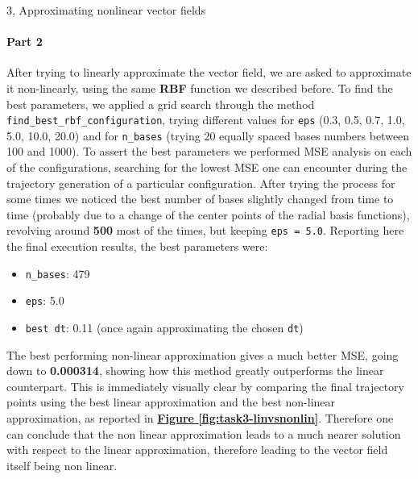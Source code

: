 \documentclass[10pt,a4paper]{article}
\begin{document}
\begin{task}{3, Approximating nonlinear vector fields}
\paragraph{Part 2}
After trying to linearly approximate the vector field, we are asked to approximate it non-linearly, using the same \textbf{RBF} function we described before. To find the best parameters, we applied a grid search through the method \texttt{find\_best\_rbf\_configuration}, trying different values for \texttt{eps} (0.3, 0.5, 0.7, 1.0, 5.0, 10.0, 20.0) and for \texttt{n\_bases} (trying 20 equally spaced bases numbers between 100 and 1000). To assert the best parameters we performed MSE analysis on each of the configurations, searching for the lowest MSE one can encounter during the trajectory generation of a particular configuration. After trying the process for some times we noticed the best number of bases slightly changed from time to time (probably due to a change of the center points of the radial basis functions), revolving around \textbf{500} most of the times, but keeping \texttt{eps = 5.0}. Reporting here the final execution results, the best parameters were:
\begin{itemize}
    \item \texttt{n\_bases}: 479 
    \item \texttt{eps}: 5.0
    \item \texttt{best dt}: 0.11 (once again approximating the chosen \texttt{dt})
\end{itemize}
The best performing non-linear approximation gives a much better MSE, going down to \textbf{0.000314}, showing how this method greatly outperforms the linear counterpart. This is immediately visually clear by comparing the final trajectory points using the best linear approximation and the best non-linear approximation, as reported in \textbf{\hyperref[fig:task3-linvsnonlin]{Figure \ref{fig:task3-linvsnonlin}}}. Therefore one can conclude that the non linear approximation leads to a much nearer solution with respect to the linear approximation, therefore leading to the vector field itself being non linear.

\begin{figure}[ht!]
 \centering
 

\end{figure}
\end{task}
\end{document}
